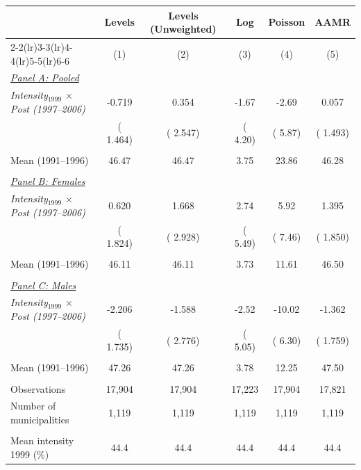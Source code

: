 \begin{tabular}{lccccc} \hline \hline
& Levels & Levels (Unweighted) & Log & Poisson & AAMR \\ 
\cmidrule(lr){2-2}\cmidrule(lr){3-3}\cmidrule(lr){4-4}\cmidrule(lr){5-5}\cmidrule(lr){6-6}
& \multicolumn{1}{c}{(1)} & \multicolumn{1}{c}{(2)} & \multicolumn{1}{c}{(3)} & \multicolumn{1}{c}{(4)} & \multicolumn{1}{c}{(5)} \\ \toprule
\underline{\textit{Panel A: Pooled}}  \\ 
\textit{Intensity$_{1999}$ $\times$ Post (1997--2006)} &       -0.719 &        0.354 &        -1.67 &        -2.69 &        0.057 \\ 
  & (       1.464) & (       2.547) & (        4.20) & (        5.87) & (       1.493) \\ 
  & & & & & \\ 
Mean (1991--1996)  &        46.47 &        46.47 &         3.75 &        23.86 &        46.28 \\ 
  & & & & &  \\ 
\underline{\textit{Panel B: Females}}  \\ 
\textit{Intensity$_{1999}$ $\times$ Post (1997--2006)}  &        0.620 &        1.668 &         2.74 &         5.92 &        1.395 \\ 
  & (       1.824) & (       2.928) & (        5.49) & (        7.46) & (       1.850) \\ 
  & & & & & \\ 
Mean (1991--1996)  &        46.11 &        46.11 &         3.73 &        11.61 &        46.50 \\ 
  & & & & &  \\ 
\underline{\textit{Panel C: Males}}  \\ 
\textit{Intensity$_{1999}$ $\times$ Post (1997--2006)} &       -2.206 &       -1.588 &        -2.52 &       -10.02 &       -1.362 \\ 
  & (       1.735) & (       2.776) & (        5.05) & (        6.30) & (       1.759) \\ 
  & & & & & \\ 
Mean (1991--1996) &        47.26 &        47.26 &         3.78 &        12.25 &        47.50 \\ 
  & & & & &  \\ 
Observations &       17,904 &       17,904 &       17,223 &       17,904 &       17,821 \\ 
Number of municipalities &        1,119 &        1,119 &        1,119 &        1,119 &        1,119 \\ 
  & & & & & \\ 
Mean intensity 1999 (\%) &   44.4 &   44.4 &   44.4 &   44.4 &   44.4 \\ 
\bottomrule
\end{tabular}